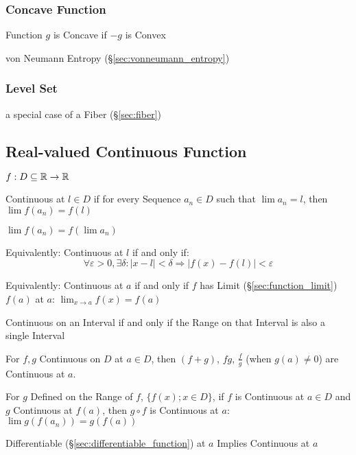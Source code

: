 \subsubsection{Concave Function}\label{sec:concave_function}

Function $g$ is Concave if $-g$ is Convex

\fist von Neumann Entropy (\S\ref{sec:vonneumann_entropy})



\subsubsection{Level Set}\label{sec:level_set}

a special case of a Fiber (\S\ref{sec:fiber})



\subsection{Real-valued Continuous Function}\label{sec:real_continuous}

$f : D \subseteq \mathbb{R} \rightarrow \mathbb{R}$

Continuous at $l \in D$ if for every Sequence $a_n \in D$ such that
$\lim a_n = l$, then $\lim f(a_n) = f(l)$

$\lim f (a_n) = f (\lim a_n)$

Equivalently: Continuous at $l$ if and only if:
\[
  \forall \varepsilon > 0, \exists \delta :
  |x - l| < \delta \Rightarrow |f(x) - f(l)| < \varepsilon
\]

Equivalently: Continuous at $a$ if and only if $f$ has Limit
(\S\ref{sec:function_limit}) $f(a)$ at $a$: $\lim_{x \rightarrow
  a}f(x) = f(a)$

Continuous on an Interval if and only if the Range on that Interval is
also a single Interval

For $f,g$ Continuous on $D$ at $a \in D$, then $(f + g)$, $f g$,
$\frac{f}{g}$ (when $g(a) \neq 0$) are Continuous at $a$.

For $g$ Defined on the Range of $f$, $\{ f(x); x \in D\}$, if $f$ is
Continuous at $a \in D$ and $g$ Continuous at $f(a)$, then $g \circ f$
is Continuous at $a$: $\lim g(f(a_n)) = g(f(a))$

Differentiable (\S\ref{sec:differentiable_function}) at $a$ Implies
Continuous at $a$

